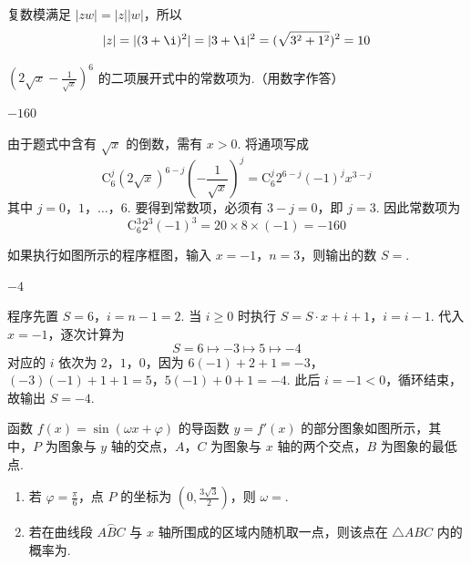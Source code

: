 \begin{solution}
复数模满足 \(|zw|=|z||w|\)，所以
\[
|z|=|(3+\i)^2|=|3+\i|^2=(\sqrt{3^2+1^2})^2=10
\]
\end{solution}

\begin{problem}
\(\left(2\sqrt{x}-\frac{1}{\sqrt{x}}\right)^6\) 的二项展开式中的常数项为\fillinblank{}.（用数字作答）
\end{problem}

\begin{answer}
\(-160\)
\end{answer}

\begin{solution}
由于题式中含有 \(\sqrt{x}\) 的倒数，需有 \(x>0\). 将通项写成
\[
\mathrm C_6^j(2\sqrt{x})^{6-j}\left(-\frac1{\sqrt{x}}\right)^j
=\mathrm C_6^j2^{6-j}(-1)^j x^{3-j}
\]
其中 \(j=0\)，\(1\)，\(\ldots\)，\(6\). 要得到常数项，必须有 \(3-j=0\)，即 \(j=3\). 因此常数项为
\[
\mathrm C_6^3 2^3(-1)^3=20\times8\times(-1)=-160
\]
\end{solution}

\begin{problem}
如果执行如图所示的程序框图，输入 \(x=-1\)，\(n=3\)，则输出的数 \(S=\)\fillinblank{}.

\end{problem}

\begin{answer}
\(-4\)
\end{answer}

\begin{solution}
程序先置 \(S=6\)，\(i=n-1=2\). 当 \(i\geqslant0\) 时执行
\(S=S\cdot x+i+1\)，\(i=i-1\).
代入 \(x=-1\)，逐次计算为
\[
S=6\longmapsto -3\longmapsto5\longmapsto-4
\]
对应的 \(i\) 依次为 \(2\)，\(1\)，\(0\)，因为
\(6(-1)+2+1=-3\)，\((-3)(-1)+1+1=5\)，\(5(-1)+0+1=-4\).
此后 \(i=-1<0\)，循环结束，故输出 \(S=-4\).
\end{solution}

\begin{problem}
函数 \(f(x)=\sin(\omega x+\varphi)\) 的导函数 \(y=f'(x)\) 的部分图象如图所示，其中，\(P\) 为图象与 \(y\) 轴的交点，\(A\)，\(C\) 为图象与 \(x\) 轴的两个交点，\(B\) 为图象的最低点.

\begin{enumerate}
\item 若 \(\varphi=\frac{\pi}{6}\)，点 \(P\) 的坐标为 \(\left(0,\frac{3\sqrt{3}}{2}\right)\)，则 \(\omega=\)\fillinblank{}.
\item 若在曲线段 \(\overset{\frown}{ABC}\) 与 \(x\) 轴所围成的区域内随机取一点，则该点在 \(\triangle ABC\) 内的概率为\fillinblank{}.
\end{enumerate}

\end{problem}

